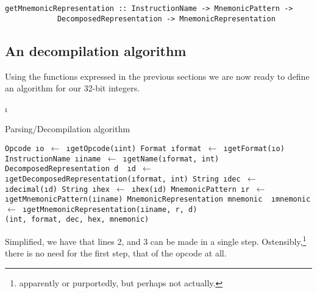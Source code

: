 \begin{verbatim}
getMnemonicRepresentation :: InstructionName -> MnemonicPattern -> 
            DecomposedRepresentation -> MnemonicRepresentation
\end{verbatim}

\subsection{An decompilation algorithm}

Using the functions expressed in the previous sections we are now ready to
define an algorithm for our 32-bit integers.

\LetLtxMacro\i\textit
\newcommand{\get}[2]{\tt{#1} \i{#2} $\gets$ }
\newcommand{\of}[1]{(\i{#1})}
\newcommand{\from}[1]{\i{#1}}

\begin{algorithm}
\caption{Parsing/Decompilation algorithm}\label{algo:decompile}
\begin{algorithmic}[1]
\State \get{Opcode}{o}\from{getOpcode}\of{int}
\State \get{Format}{format}\from{getFormat}\of{o}
\State \get{InstructionName}{iname}\from{getName}\of{format, int}
\State \tt{DecomposedRepresentation} d
\State \get{}{d}\from{getDecomposedRepresentation}\of{format, int}
\State \get{String}{dec}\from{decimal}\of{d}
\State \get{String}{hex}\from{hex}\of{d}
\State \get{MnemonicPattern}{r}\from{getMnemonicPattern}\of{iname}
\State \tt{MnemonicRepresentation} mnemonic
\State \get{}{mnemonic}\from{getMnemonicRepresentation}\of{iname, r, d} \\
\Return (int, format, dec, hex, mnemonic)
\EndProcedure
\end{algorithmic}
\end{algorithm}

Simplified, we have that lines 2, and 3 can be made in a single
step. Ostensibly,\footnote{apparently or purportedly, but perhaps not
actually.} there is no need for the first step, that of the opcode at
all.

